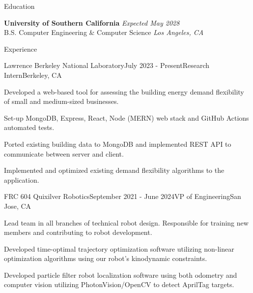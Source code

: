 \documentclass[
	11pt, %
]{tex/resume} %
\begin{document}

\begin{rSection}{Education}
	
	\textbf{University of Southern California} \hfill \textit{Expected May 2028} \\ 
	B.S. Computer Engineering \& Computer Science \hfill \textit{Los Angeles, CA}
	
\end{rSection}


\begin{rSection}{Experience}

	\begin{rSubsection}{Lawrence Berkeley National Laboratory}{July 2023 - Present}{Research Intern}{Berkeley, CA}
		\item Developed a web-based tool for assessing the building energy demand flexibility of small and medium-sized businesses.
		\item Set-up MongoDB, Express, React, Node (MERN) web stack and GitHub Actions automated tests.
        \item Ported existing building data to MongoDB and implemented REST API to communicate between server and client.
        \item Implemented and optimized existing demand flexibility algorithms to the application.
        
	\end{rSubsection}


	\begin{rSubsection}{FRC 604 Quixilver Robotics}{September 2021 - June 2024}{VP of Engineering}{San Jose, CA}
		\item Lead team in all branches of technical robot design. Responsible for training new members and contributing to robot development.
        \item Developed time-optimal trajectory optimization software utilizing non-linear optimization algorithms using our robot’s kinodynamic constraints.
        \item Developed particle filter robot localization software using both odometry and computer vision utilizing PhotonVision/OpenCV to detect AprilTag targets.
        
	\end{rSubsection}





\end{rSection}
\end{document}
